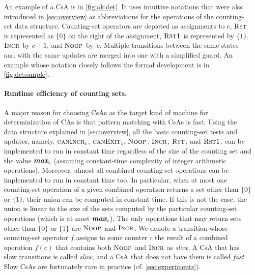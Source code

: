 \documentclass[acmsmall,screen]{acmart}
\begin{document}
\begin{ex} An example of a CsA is in \cref{fig:ak:det}. It uses intuitive
  notations that were also introduced in \cref{sec:overview} as
  abbreviations for the operations of the counting-set data structure.
Counting-set operators are
depicted as assignments to $c$, $\textsc{Rst}_{{}}$ is represented as $\{0\}$ on the
right of the assignment, $\textsc{Rst1}_{{}}$ is represented by $\{1\}$, $\textsc{Incr}_{{}}$
by $c+1$, and $\textsc{Noop}_{{}}$ by~$c$. Multiple transitions between the same states and
with the same updates are merged into one with a simplified guard. An example
whose notation closely follows the formal development is in
  \cref{fig:detsample}.
\end{ex}

\paragraph{Runtime efficiency of counting sets.}

\cbstart
A major reason for choosing CsAs as the target kind of machine for
determinization of CAs is that pattern matching with CsAs is fast.
%
%
Using the data structure explained in \cref{sec:overview}, all the basic
counting-set tests and updates, namely,  $\textsc{canIncr}_{c}$, $\textsc{canExit}_{c}$, $\textsc{Noop}_{{}}$,
$\textsc{Incr}_{{}}$, $\textsc{Rst}_{{}}$, and $\textsc{Rst1}_{{}}$, can be implemented to run in
constant time regardless of the size of the counting set and the value $\textit{\textbf{max}}_{c}$
(assuming constant-time complexity of integer arithmetic operations).
%
Moreover, almost all combined counting-set operations can be implemented to run
in constant time too. 
%
In particular, when at most one counting-set operation of a given combined
operation returns a set other than $\{0\}$ or $\{1\}$, their union can be
computed in constant time.
%
%
%
If this is not the case, the union is linear to the size of the sets computed by
the particular counting-set operations (which is at most $\textit{\textbf{max}}_{c}$).
%
The only operations that may return sets other than $\{0\}$ or $\{1\}$ are
$\textsc{Noop}_{{}}$ and $\textsc{Incr}_{{}}$. 
%
We denote a transition whose counting-set operator $f$ assigns to some counter
$c$ the result of a combined operation $f(c)$ that contains both $\textsc{Noop}_{{}}$ and
$\textsc{Incr}_{{}}$ as \emph{slow}.
%
A CsA that has slow transitions is called \emph{slow}, and a CsA that does not
have them is called \emph{fast}.
%
Slow CsAs are fortunately rare in practice (cf. \cref{sec:experiments}). 
 
\end{document}
